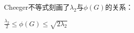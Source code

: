 Cheeger不等式刻画了$\lambda_2$与$\phi(G)$的关系：

\begin{theorem}[Cheeger不等式]
\label{thm:cheeger}
    $\frac{\lambda_2}{2}\leq\phi(G)\leq\sqrt{2\lambda_2}$
\end{theorem}




